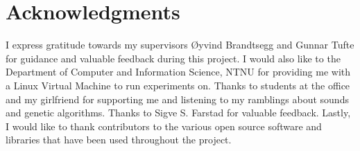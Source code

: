 \section*{Acknowledgments}
I express gratitude towards my supervisors Øyvind Brandtsegg and Gunnar Tufte for guidance and valuable feedback during this project. I would also like to the Department of Computer and Information Science, NTNU for providing me with a Linux Virtual Machine to run experiments on. Thanks to students at the office and my girlfriend for supporting me and listening to my ramblings about sounds and genetic algorithms. Thanks to Sigve S. Farstad for valuable feedback. Lastly, I would like to thank contributors to the various open source software and libraries that have been used throughout the project.
